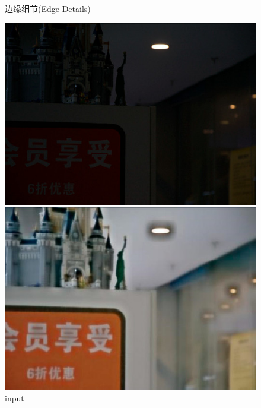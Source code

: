 \documentclass[CJK,aspectratio=169]{beamer}  %
\begin{document}
\begin{frame}
\begin{figure}
\begin{minipage}{.3\columnwidth}
\begin{itemize}
					 \yahei 边缘细节(Edge Details)
				\end{itemize}
			\end{minipage}
			\begin{minipage}{.65\columnwidth}
				\setlength{\abovecaptionskip}{-0.05cm}
				\centering 
				\begin{minipage}{0.17\columnwidth}
					\includegraphics[width=\linewidth]{picture/LLIE/VE-LOL-L/input}
					\caption*{\tiny input \\ \quad }
					\label{fig: input}
				\end{minipage}
				\begin{minipage}{0.17\columnwidth}
					\includegraphics[width=\linewidth]{picture/LLIE/VE-LOL-L/LLNet}

\end{minipage}
\end{minipage}
\end{figure}
\end{frame}
\end{document}
